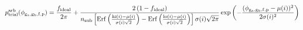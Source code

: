 \documentclass[12pt]{article}
\begin{document}
\begin{displaymath}
p_{\rm trial}^{\rm arb}(\phi_{\rm g_a,g_b,f,p}) = 
{{f_{\rm ideal}}\over{2 \pi}} +
{
{2 \left(1 - f_{\rm ideal}\right)}
\over
{
n_{\rm sub}
\left[
{\rm Erf}\left({{{\rm hi}(i)-\mu(i)}\over{\sigma(i) \sqrt{2}}}\right)
- {\rm Erf}\left({{{\rm lo}(i)-\mu(i)}\over{\sigma(i) \sqrt{2}}}\right)
\right]
\sigma(i) \sqrt{2 \pi}
}
}
\exp\left(-{{(\phi_{\rm g_a,g_b,f,p} - \mu(i))^2}\over{2 \sigma(i)^2}}\right)
\end{displaymath}
\end{document}
